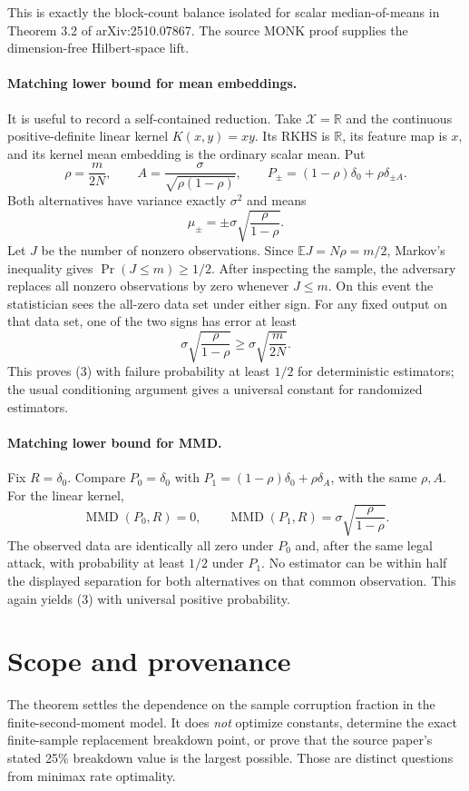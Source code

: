 \documentclass[11pt]{article}
\newcommand{\MMD}{\operatorname{MMD}}
\begin{document}
This is exactly the block-count balance isolated for scalar median-of-means
in Theorem 3.2 of arXiv:2510.07867.  The source MONK proof supplies the
dimension-free Hilbert-space lift.

\paragraph{Matching lower bound for mean embeddings.}
It is useful to record a self-contained reduction.  Take
$\mathcal X=\mathbb R$ and the continuous positive-definite linear kernel
$K(x,y)=xy$.  Its RKHS is $\mathbb R$, its feature map is $x$, and its kernel
mean embedding is the ordinary scalar mean.  Put
\[
 \rho=\frac{m}{2N},\qquad
 A=\frac{\sigma}{\sqrt{\rho(1-\rho)}},\qquad
 P_{\pm}=(1-\rho)\delta_0+\rho\delta_{\pm A}.
\]
Both alternatives have variance exactly $\sigma^2$ and means
\[
 \mu_{\pm}=\pm\sigma\sqrt{\frac{\rho}{1-\rho}}.
\]
Let $J$ be the number of nonzero observations.  Since
$\mathbb EJ=N\rho=m/2$, Markov's inequality gives
$\Pr(J\le m)\ge1/2$.  After inspecting the sample, the adversary replaces
all nonzero observations by zero whenever $J\le m$.  On this event the
statistician sees the all-zero data set under either sign.  For any fixed
output on that data set, one of the two signs has error at least
\[
 \sigma\sqrt{\frac{\rho}{1-\rho}}
 \ge \sigma\sqrt{\frac{m}{2N}}.
\]
This proves (3) with failure probability at least $1/2$ for deterministic
estimators; the usual conditioning argument gives a universal constant for
randomized estimators.

\paragraph{Matching lower bound for MMD.}
Fix $R=\delta_0$.  Compare $P_0=\delta_0$ with
$P_1=(1-\rho)\delta_0+\rho\delta_A$, with the same $\rho,A$.  For the linear
kernel,
\[
 \MMD(P_0,R)=0,\qquad
 \MMD(P_1,R)=\sigma\sqrt{\frac{\rho}{1-\rho}}.
\]
The observed data are identically all zero under $P_0$ and, after the same
legal attack, with probability at least $1/2$ under $P_1$.  No estimator can
be within half the displayed separation for both alternatives on that common
observation.  This again yields (3) with universal positive probability.

\section*{Scope and provenance}

The theorem settles the dependence on the sample corruption fraction in the
finite-second-moment model.  It does \emph{not} optimize constants, determine
the exact finite-sample replacement breakdown point, or prove that the
source paper's stated 25\% breakdown value is the largest possible.  Those
are distinct questions from minimax rate optimality.
\end{document}
